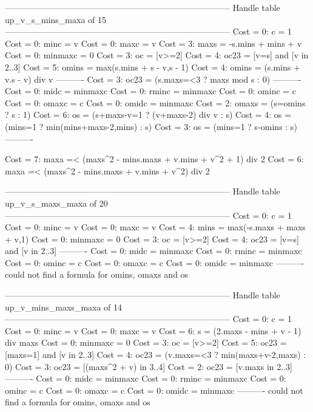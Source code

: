 --------------------------------------------------------------------------------
Handle table up_v_s_mins_maxa of 15
--------------------------------------------------------------------------------
Cost =  0:  c       = 1
Cost =  0:  minc    = v
Cost =  0:  maxc    = v
Cost =  3:  maxs    = -s.mins + mins + v
Cost =  0:  minmaxc = 0
Cost =  3:  oc      = [v>=2]
Cost =  4:  oc23    = [v=s] and [v in 2..3]
Cost =  5:  omins   = max(s.mins + s - v,s - 1)
Cost =  4:  omins   = (s.mins + v.s - v) div v
----------
Cost =  3:  oc23    = (s.maxs=<3 ? maxs mod s : 0)
----------
Cost =  0:  midc    = minmaxc
Cost =  0:  rminc   = minmaxc
Cost =  0:  ominc   = c
Cost =  0:  omaxc   = c
Cost =  0:  omidc   = minmaxc
Cost =  2:  omaxs   = (s=omins ? s : 1)
Cost =  6:  os      = (s+maxs-v=1 ? (v+maxs-2) div v : s)
Cost =  4:  os      = (mins=1 ? min(mins+maxs-2,mins) : s)
Cost =  3:  os      = (mins=1 ? s-omins : s)
----------

Cost =  7:  maxa =< (maxs^2 - mins.maxs + v.mins + v^2 + 1) div 2
Cost =  6:  maxa =< (maxs^2 - mins.maxs + v.mins + v^2) div 2

--------------------------------------------------------------------------------
Handle table up_v_s_maxs_maxa of 20
--------------------------------------------------------------------------------
Cost =  0:  c       = 1
Cost =  0:  minc    = v
Cost =  0:  maxc    = v
Cost =  4:  mins    = max(-s.maxs + maxs + v,1)
Cost =  0:  minmaxc = 0
Cost =  3:  oc      = [v>=2]
Cost =  4:  oc23    = [v=s] and [v in 2..3]
----------
Cost =  0:  midc    = minmaxc
Cost =  0:  rminc   = minmaxc
Cost =  0:  ominc   = c
Cost =  0:  omaxc   = c
Cost =  0:  omidc   = minmaxc
----------
could not find a formula for omins, omaxs and os


--------------------------------------------------------------------------------
Handle table up_v_mins_maxs_maxa of 14
--------------------------------------------------------------------------------
Cost =  0:  c       = 1
Cost =  0:  minc    = v
Cost =  0:  maxc    = v
Cost =  6:  s       = (2.maxs - mins + v - 1) div maxs
Cost =  0:  minmaxc = 0
Cost =  3:  oc      = [v>=2]
Cost =  5:  oc23    = [maxs=1] and [v in 2..3]
Cost =  4:  oc23    = (v.maxs=<3 ? min(maxs+v-2,maxs) : 0)
Cost =  3:  oc23    = [(maxs^2 + v) in 3..4]
Cost =  2:  oc23    = [v.maxs in 2..3]
----------
Cost =  0:  midc    = minmaxc
Cost =  0:  rminc   = minmaxc
Cost =  0:  ominc   = c
Cost =  0:  omaxc   = c
Cost =  0:  omidc   = minmaxc
----------
could not find a formula for omins, omaxs and os


